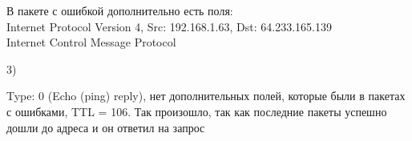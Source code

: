 \documentclass[a4paper,11pt]{article}
\begin{document}
\begin{center}
\label{fig:image}
\end{center}
В пакете с ошибкой дополнительно есть поля: \\
Internet Protocol Version 4, Src: 192.168.1.63, Dst: 64.233.165.139 \\
Internet Control Message Protocol

3)
\begin{center}
\label{fig:image}
\end{center}
Type: 0 (Echo (ping) reply), нет дополнительных полей, которые были в пакетах с ошибками,  TTL = 106. Так произошло, так как последние пакеты успешно дошли до адреса и он ответил на запрос
\end{document}
